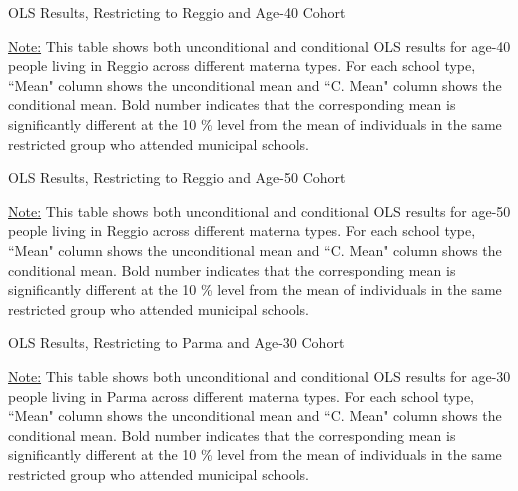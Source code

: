 \documentclass[11pt]{article}
\begin{document}
\begin{table}[H]
\begin{center}
	\caption{OLS Results, Restricting to Reggio and Age-40 Cohort} \label{table:OLS-R40-E}
	\scalebox{0.75}{
		
	}
	\end{center}
	\footnotesize
\underline{Note:} This table shows both unconditional and conditional OLS results for age-40 people living in Reggio across different materna types. For each school type, ``Mean" column shows the unconditional mean and ``C. Mean" column shows the conditional mean. Bold number indicates that the corresponding mean is significantly different at the 10 \% level from the mean of individuals in the same restricted group who attended municipal schools.

\end{table}

\begin{table}[H]
\begin{center}
	\caption{OLS Results, Restricting to Reggio and Age-50 Cohort} \label{table:OLS-R50-E}
	\scalebox{0.75}{
		
	}
	\end{center}
	\footnotesize
\underline{Note:} This table shows both unconditional and conditional OLS results for age-50 people living in Reggio across different materna types. For each school type, ``Mean" column shows the unconditional mean and ``C. Mean" column shows the conditional mean. Bold number indicates that the corresponding mean is significantly different at the 10 \% level from the mean of individuals in the same restricted group who attended municipal schools.

\end{table}

\begin{table}[H]
\begin{center}
	\caption{OLS Results, Restricting to Parma and Age-30 Cohort} \label{table:OLS-P30-E}
	\scalebox{0.72}{
		
	}
	\end{center}
	\footnotesize
\underline{Note:} This table shows both unconditional and conditional OLS results for age-30 people living in Parma across different materna types. For each school type, ``Mean" column shows the unconditional mean and ``C. Mean" column shows the conditional mean. Bold number indicates that the corresponding mean is significantly different at the 10 \% level from the mean of individuals in the same restricted group who attended municipal schools.

\end{table}
\end{document}
